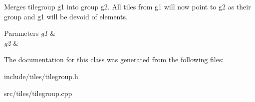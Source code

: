 Merges tilegroup g1 into group g2. All tiles from g1 will now point to g2 as their group and g1 will be devoid of elements. 
\begin{DoxyParams}{Parameters}
{\em g1} & \\
\hline
{\em g2} & \\
\hline
\end{DoxyParams}


The documentation for this class was generated from the following files\-:\begin{DoxyCompactItemize}
\item 
include/tiles/tilegroup.\-h\item 
src/tiles/tilegroup.\-cpp\end{DoxyCompactItemize}
